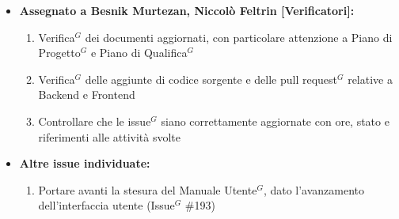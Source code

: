 \documentclass[a4paper,10pt]{article}
\begin{document}
\begin{itemize}
\item \textbf{Assegnato a Besnik Murtezan, Niccolò Feltrin [Verificatori]:}
    \begin{enumerate}
    \item Verifica$^G$ dei documenti aggiornati, con particolare attenzione a Piano di Progetto$^G$ e Piano di Qualifica$^G$
    \item Verifica$^G$ delle aggiunte di codice sorgente e delle pull request$^G$ relative a Backend e Frontend
    \item Controllare che le issue$^G$ siano correttamente aggiornate con ore, stato e riferimenti alle attività svolte
    \end{enumerate}

\item \textbf{Altre issue individuate:}
    \begin{enumerate}
    \item Portare avanti la stesura del Manuale Utente$^G$, dato l'avanzamento dell'interfaccia utente  (Issue$^G$ \#193)
    \end{enumerate}
\end{itemize}
\end{document}
